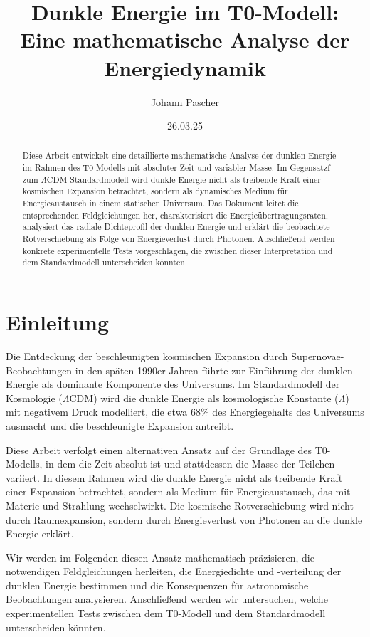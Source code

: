 \documentclass[a4paper,12pt]{article}
\begin{document}
\title{Dunkle Energie im T0-Modell: \\Eine mathematische Analyse der Energiedynamik}
\author{Johann Pascher}
\date{26.03.25}
\maketitle

\begin{abstract}
	Diese Arbeit entwickelt eine detaillierte mathematische Analyse der dunklen Energie im Rahmen des T0-Modells mit absoluter Zeit und variabler Masse. Im Gegensatzf zum $\Lambda$CDM-Standardmodell wird dunkle Energie nicht als treibende Kraft einer kosmischen Expansion betrachtet, sondern als dynamisches Medium für Energieaustausch in einem statischen Universum. Das Dokument leitet die entsprechenden Feldgleichungen her, charakterisiert die Energieübertragungsraten, analysiert das radiale Dichteprofil der dunklen Energie und erklärt die beobachtete Rotverschiebung als Folge von Energieverlust durch Photonen. Abschließend werden konkrete experimentelle Tests vorgeschlagen, die zwischen dieser Interpretation und dem Standardmodell unterscheiden könnten.
\end{abstract}

\tableofcontents
\newpage

\section{Einleitung}

Die Entdeckung der beschleunigten kosmischen Expansion durch Supernovae-Beobachtungen in den späten 1990er Jahren führte zur Einführung der dunklen Energie als dominante Komponente des Universums. Im Standardmodell der Kosmologie ($\Lambda$CDM) wird die dunkle Energie als kosmologische Konstante ($\Lambda$) mit negativem Druck modelliert, die etwa 68\% des Energiegehalts des Universums ausmacht und die beschleunigte Expansion antreibt.

Diese Arbeit verfolgt einen alternativen Ansatz auf der Grundlage des T0-Modells, in dem die Zeit absolut ist und stattdessen die Masse der Teilchen variiert. In diesem Rahmen wird die dunkle Energie nicht als treibende Kraft einer Expansion betrachtet, sondern als Medium für Energieaustausch, das mit Materie und Strahlung wechselwirkt. Die kosmische Rotverschiebung wird nicht durch Raumexpansion, sondern durch Energieverlust von Photonen an die dunkle Energie erklärt.

Wir werden im Folgenden diesen Ansatz mathematisch präzisieren, die notwendigen Feldgleichungen herleiten, die Energiedichte und -verteilung der dunklen Energie bestimmen und die Konsequenzen für astronomische Beobachtungen analysieren. Anschließend werden wir untersuchen, welche experimentellen Tests zwischen dem T0-Modell und dem Standardmodell unterscheiden könnten.
\end{document}
